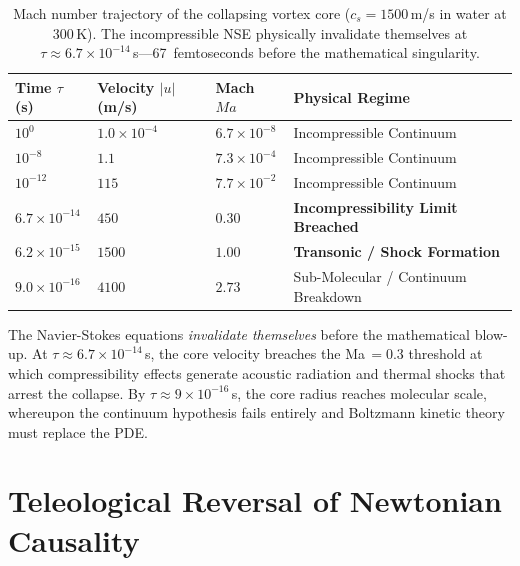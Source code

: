\documentclass[11pt,a4paper]{article}
\begin{document}
\begin{table}[htbp]
\centering
\footnotesize
\begin{tabular}{@{}p{2.3cm}p{2.4cm}p{2.2cm}p{4.2cm}@{}}
\toprule
\textbf{Time} $\tau$\,(s) &
\textbf{Velocity} $|u|$\,(m/s) &
\textbf{Mach} $Ma$ &
\textbf{Physical Regime} \\
\midrule
$10^{0}$              & $1.0 \times 10^{-4}$ & $6.7 \times 10^{-8}$ & Incompressible Continuum \\
$10^{-8}$             & $1.1$                & $7.3 \times 10^{-4}$ & Incompressible Continuum \\
$10^{-12}$            & $115$                & $7.7 \times 10^{-2}$ & Incompressible Continuum \\
$6.7 \times 10^{-14}$ & $450$                & $0.30$               & \textbf{Incompressibility Limit Breached} \\
$6.2 \times 10^{-15}$ & $1500$               & $1.00$               & \textbf{Transonic / Shock Formation} \\
$9.0 \times 10^{-16}$ & $4100$               & $2.73$               & Sub-Molecular / Continuum Breakdown \\
\bottomrule
\end{tabular}
\caption{Mach number trajectory of the collapsing vortex core ($c_s = 1500$\,m/s in water at
300\,K). The incompressible NSE physically invalidate themselves at
$\tau \approx 6.7 \times 10^{-14}$\,s---67~femtoseconds before the mathematical singularity.}
\label{tab:mach}
\end{table}

The Navier-Stokes equations \emph{invalidate themselves} before the mathematical blow-up. At
$\tau \approx 6.7 \times 10^{-14}$\,s, the core velocity breaches the Ma\,$= 0.3$ threshold at
which compressibility effects generate acoustic radiation and thermal shocks that arrest the
collapse. By $\tau \approx 9 \times 10^{-16}$\,s, the core radius reaches molecular scale,
whereupon the continuum hypothesis fails entirely and Boltzmann kinetic theory must replace the PDE.

\section{Teleological Reversal of Newtonian Causality}
\end{document}
